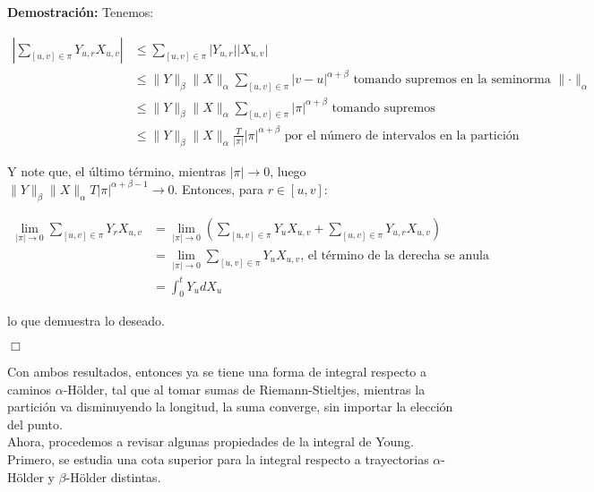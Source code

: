 \textbf{Demostración:} Tenemos:

\begin{align*}
	\left \lvert  \sum_{ [u,v] \in \pi  } Y_{u,r} X_{u,v}  \right \rvert &\leq  \sum_{ [u,v] \in \pi  } \lvert Y_{u,r} \rvert \lvert X_{u,v} \rvert \\
	&\leq \lVert Y \rVert_{\beta} \lVert X \rVert_{\alpha} \sum_{ [u,v] \in \pi } \lvert v - u \rvert^{ \alpha + \beta } \text{ tomando supremos en la seminorma } \lVert \cdot \rVert_{\alpha} \\
	&\leq \lVert Y \rVert_{\beta} \lVert X \rVert_{ \alpha } \sum_{ [u,v] \in \pi } \lvert \pi \rvert^{\alpha + \beta} \text{ tomando supremos } \\
	&\leq \lVert Y \rVert_{\beta} \lVert X \rVert_{ \alpha } \frac{T}{\lvert \pi \rvert} \lvert \pi \rvert^{\alpha + \beta} \text{ por el número de intervalos en la partición }
\end{align*}

Y note que, el último término, mientras $\lvert \pi \rvert \rightarrow 0$, luego $\lVert Y \rVert_{\beta} \lVert X \rVert_{ \alpha } T \lvert \pi \rvert^{\alpha + \beta -1} \rightarrow 0$. Entonces, para $r \in [u,v]$:

\begin{align*}
	\lim_{ \lvert \pi \rvert \rightarrow 0} \sum_{ [u,v] \in \pi } Y_r X_{u,v} &= \lim_{ \lvert \pi \rvert \rightarrow 0} \left( \sum_{ [u,v] \in \pi } Y_u X_{u,v} + \sum_{ [u,v] \in \pi } Y_{u,r} X_{u,v}  \right)  \\
	&= \lim_{\lvert \pi \rvert \rightarrow 0} \sum_{[u,v] \in \pi} Y_u X_{u,v} \text{, el término de la derecha se anula } \\
	&= \int_0^t Y_u dX_u
\end{align*}

lo que demuestra lo deseado.

\begin{flushright}
	$\Box$
\end{flushright}


Con ambos resultados, entonces ya se tiene una forma de integral respecto a caminos $\alpha$-Hölder, tal que al tomar sumas de Riemann-Stieltjes, mientras la partición va disminuyendo la longitud, la suma converge, sin importar la elección del punto. \\

Ahora, procedemos a revisar algunas propiedades de la integral de Young. Primero, se estudia una cota superior para la integral respecto a trayectorias $\alpha$-Hölder y $\beta$-Hölder distintas.

